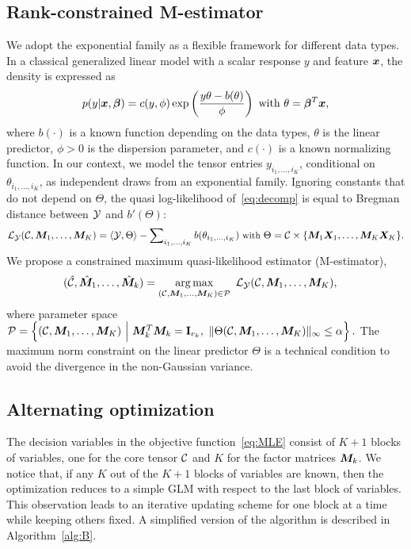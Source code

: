 \documentclass{article}
\theoremstyle{definition}
\theoremstyle{definition}
\begin{document}
\subsection{Rank-constrained M-estimator}
 We adopt the exponential family as a flexible framework for different data types. In a classical generalized linear model with a scalar response $y$ and feature $\bm x$, the density is expressed as
\[
p(y|\mx, \boldsymbol{\beta})=c(y,\phi)\exp\left(\frac{y\theta- b(\theta)}{\phi}\right)\ \text{with}\ \theta=\boldsymbol{\beta}^T\mx,
\]
where $b(\cdot)$ is a known function depending on the data types, $\theta$ is the linear predictor, $\phi>0$ is the dispersion parameter, and $c(\cdot)$ is a known normalizing function. In our context, we model the tensor entries $y_{i_1,\ldots,i_K}$, conditional on $\theta_{i_1,\ldots,i_K}$, as independent draws from an exponential family. Ignoring constants that do not depend on $\Theta$, the quasi log-likelihood of~\eqref{eq:decomp} is equal to Bregman distance between $\mathcal{Y}$ and $b'(\Theta)$:
\begin{equation}\label{eq:loglikelihood}
\small
\tL_{\tY}(\tC,\mM_1,\ldots,\mM_K)=\langle \tY, \Theta \rangle - \sum\nolimits_{i_1,\ldots,i_K} b(\theta_{i_1,\ldots,i_K})\ \text{with}\ \Theta=\tC\times\{\mM_1\mX_1,\ldots,\mM_K\mX_K\}.
\end{equation}
We propose a constrained maximum quasi-likelihood estimator (M-estimator),
\begin{align} \label{eq:MLE} 
(\hat \tC, \hat \mM_1,\ldots,\hat \mM_k) &=\argmax_{(\tC,\mM_1,\ldots,\mM_K)\in \tP} \ \tL_{\tY}(\tC,\mM_1,\ldots,\mM_K),
\end{align}
where parameter space 
$
\tP=\left\{(\tC, \mM_1,\ldots,\mM_K) \ \Big| \ \mM_k^T\mM_k=\mathbf{I}_{r_k},\ \mnormSize{}{\Theta(\tC,\mM_1,\ldots,\mM_K)}\leq \alpha \right\}.
$
The maximum norm constraint on the linear predictor $\Theta$ is a technical condition to avoid the divergence in the non-Gaussian variance.


\subsection{Alternating optimization}

The decision variables in the objective function~\eqref{eq:MLE} consist of $K+1$ blocks of variables, one for the core tensor $\mathcal{C}$ and $K$ for the factor matrices $\bm M_k$. We notice that, if any $K$ out of the $K+1$ blocks of variables are known, then the optimization reduces to a simple GLM with respect to the last block of variables. This observation leads to an iterative updating scheme for one block at a time while keeping others fixed.  A simplified version of the algorithm is described in Algorithm~\ref{alg:B}. 
\end{document}
